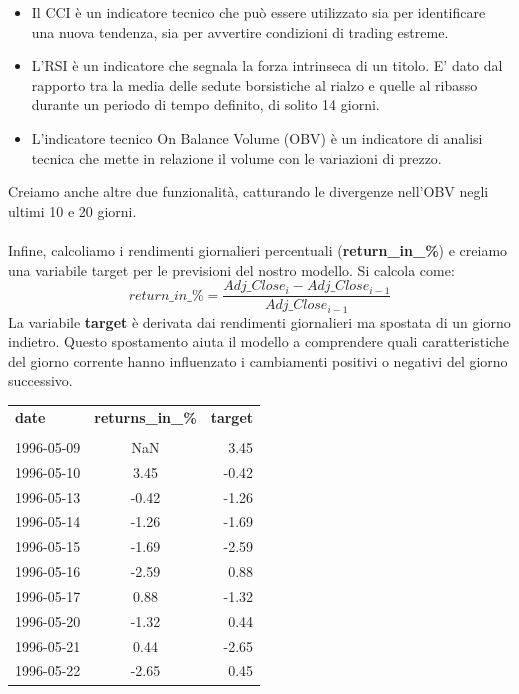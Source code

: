 \documentclass{article}
\begin{document}
\begin{itemize}
    \item Il CCI è un indicatore tecnico che può essere utilizzato sia per identificare una nuova tendenza, sia per avvertire condizioni di trading estreme.
    \item L'RSI è un indicatore che segnala la forza intrinseca di un titolo. E' dato dal rapporto tra la media delle sedute borsistiche al rialzo e quelle al ribasso durante un periodo di tempo definito, di solito 14 giorni.
    \item L'indicatore tecnico On Balance Volume (OBV) è un indicatore di analisi tecnica che mette in relazione il volume con le variazioni di prezzo.
\end{itemize}
Creiamo anche altre due funzionalità, catturando le divergenze nell'OBV negli ultimi 10 e 20 giorni. \\ \\
Infine, calcoliamo i rendimenti giornalieri percentuali (\textbf{return\_in\_\%}) e creiamo una variabile target per le previsioni del nostro modello. Si calcola come: 
\begin{equation}
    return\_in\_\% = \frac{Adj\_Close_i - Adj\_Close_{i-1}}{Adj\_Close_{i-1}}
\end{equation}
La variabile \textbf{target} è derivata dai rendimenti giornalieri ma spostata di un giorno indietro. Questo spostamento aiuta il modello a comprendere quali caratteristiche del giorno corrente hanno influenzato i cambiamenti positivi o negativi del giorno successivo.
\begin{center}
    \begin{tabular}{lcr}
    \textbf{date} & \textbf{returns\_in\_\%} & \textbf{target}\\ \\
    1996-05-09 & NaN & 3.45 \\
    1996-05-10 & 3.45 & -0.42 \\
    1996-05-13 & -0.42 & -1.26 \\
    1996-05-14 & -1.26 & -1.69 \\
    1996-05-15 & -1.69 & -2.59 \\
    1996-05-16 & -2.59 & 0.88 \\
    1996-05-17 & 0.88 & -1.32 \\
    1996-05-20 & -1.32 & 0.44 \\
    1996-05-21 & 0.44 & -2.65 \\
    1996-05-22 & -2.65 & 0.45 \\
    \end{tabular}
\end{center}

\end{document}
